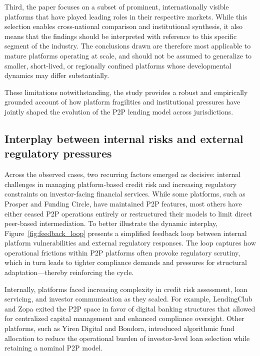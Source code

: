 \documentclass[pdflatex,sn-apa]{sn-jnl}%
\theoremstyle{thmstyleone}%
\theoremstyle{thmstyletwo}%
\theoremstyle{thmstylethree}%
\begin{document}
\textcolor{NavyBlue}{
Third, the paper focuses on a subset of prominent, internationally visible platforms that have played leading roles in their respective markets. While this selection enables cross-national comparison and institutional synthesis, it also means that the findings should be interpreted with reference to this specific segment of the industry. The conclusions drawn are therefore most applicable to mature platforms operating at scale, and should not be assumed to generalize to smaller, short-lived, or regionally confined platforms whose developmental dynamics may differ substantially.}

\textcolor{NavyBlue}{
These limitations notwithstanding, the study provides a robust and empirically grounded account of how platform fragilities and institutional pressures have jointly shaped the evolution of the P2P lending model across jurisdictions.}


\subsection{Interplay between internal risks and external regulatory pressures}
Across the observed cases, two recurring factors emerged as decisive: internal challenges in managing platform-based credit risk and increasing regulatory constraints on investor-facing financial services. While some platforms, such as Prosper and Funding Circle, have maintained P2P features, most others have either ceased P2P operations entirely or restructured their models to limit direct peer-based intermediation. \textcolor{NavyBlue}{
To better illustrate the dynamic interplay, Figure~\ref{fig:feedback_loop} presents a simplified feedback loop between internal platform vulnerabilities and external regulatory responses. The loop captures how operational frictions within P2P platforms often provoke regulatory scrutiny, which in turn leads to tighter compliance demands and pressures for structural adaptation—thereby reinforcing the cycle.
}

Internally, platforms faced increasing complexity in credit risk assessment, loan servicing, and investor communication as they scaled. For example, LendingClub and Zopa exited the P2P space in favor of digital banking structures that allowed for centralized capital management and enhanced compliance oversight. Other platforms, such as Yiren Digital and Bondora, introduced algorithmic fund allocation to reduce the operational burden of investor-level loan selection while retaining a nominal P2P model.
\end{document}
